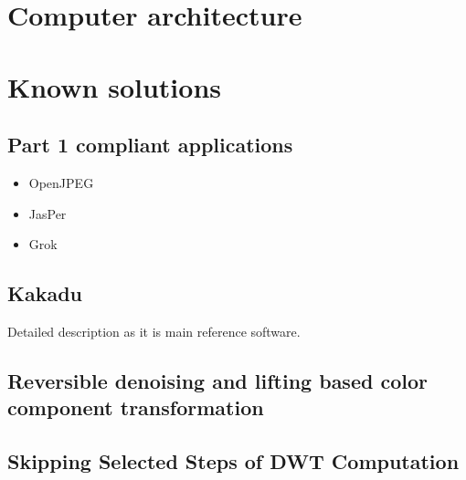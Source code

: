 \section{Computer architecture}

    

\section{Known solutions}

\subsection{Part 1 compliant applications}

\begin{itemize}
    \item OpenJPEG
    \item JasPer
    \item Grok
\end{itemize}

\subsection{Kakadu}

Detailed description as it is main reference software.

\subsection{Reversible denoising and lifting based color component transformation}

\subsection{Skipping Selected Steps of DWT Computation}
